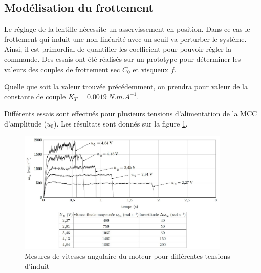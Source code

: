 \subsection{Modélisation du frottement}
\ifprof\else
Le réglage de la lentille nécessite un asservissement en position. Dans ce cas le frottement qui induit une non-linéarité avec un seuil va perturber le système. Ainsi, il est primordial de quantifier les coefficient pour pouvoir
régler la commande. Des essais ont été réalisés sur un prototype pour déterminer les valeurs des couples de
frottement sec $C_0$ et visqueux $f$.

Quelle que soit la valeur trouvée précédemment, on prendra pour valeur de la constante de couple $K_T= \SI{0,0019}{N. m. A^{-1}}$.

Différents essais sont effectués pour plusieurs tensions d'alimentation de la MCC d'amplitude ($u_0$). Les résultats sont donnés sur
la figure \ref{fig13}.

\begin{figure}[!htb]
\begin{center}
\includegraphics[width=0.9\textwidth]{images/image_fig13.jpg}
\caption{Mesures de vitesses angulaire du moteur pour différentes tensions d’induit \label{fig13}}
\end{center}
\end{figure}
\fi


